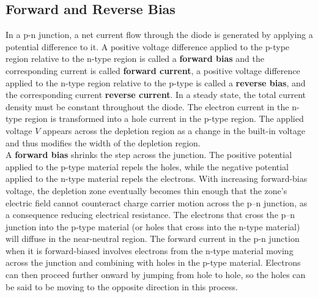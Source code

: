 \documentclass[report]{subfiles}
\begin{document}
\subsection{Forward and Reverse Bias}

In a p-n junction, a net current flow through the diode is generated by applying a potential difference to it. A positive voltage difference applied to the p-type region relative to the n-type region is called a \textbf{forward bias} and the corresponding current is called \textbf{forward current}, a positive voltage difference applied to the n-type region relative to the p-type is called a \textbf{reverse bias}, and the corresponding current \textbf{reverse current}. In a steady state, the total current density must be constant throughout the diode. The electron current in the n-type region is transformed into a hole current in the p-type region. The applied voltage \(V\) appears across the depletion region as a change in the built-in voltage and thus modifies the width of the depletion region.\\
A \textbf{forward bias} shrinks the step across the junction. The positive potential applied to the p-type material repels the holes, while the negative potential applied to the n-type material repels the electrons. With increasing forward-bias voltage, the depletion zone eventually becomes thin enough that the zone's electric field cannot counteract charge carrier motion across the p–n junction, as a consequence reducing electrical resistance. The electrons that cross the p–n junction into the p-type material (or holes that cross into the n-type material) will diffuse in the near-neutral region. The forward current in the p-n junction when it is forward-biased involves electrons from the n-type material moving across the junction and combining with holes in the p-type material. Electrons can then proceed further onward by jumping from hole to hole, so the holes can be said to be moving to the opposite direction in this process.
\end{document}
